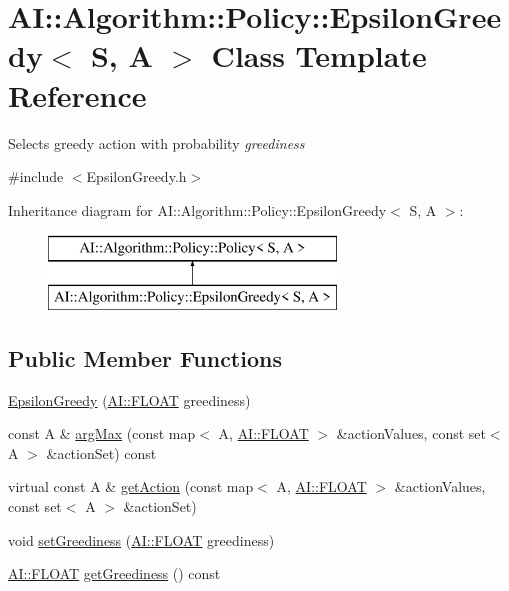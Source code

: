 \hypertarget{classAI_1_1Algorithm_1_1Policy_1_1EpsilonGreedy}{\section{A\-I\-:\-:Algorithm\-:\-:Policy\-:\-:Epsilon\-Greedy$<$ S, A $>$ Class Template Reference}
\label{classAI_1_1Algorithm_1_1Policy_1_1EpsilonGreedy}
}


Selects greedy action with probability {\itshape greediness}  




{\ttfamily \#include $<$Epsilon\-Greedy.\-h$>$}

Inheritance diagram for A\-I\-:\-:Algorithm\-:\-:Policy\-:\-:Epsilon\-Greedy$<$ S, A $>$\-:\begin{figure}[H]
\begin{center}
\leavevmode
\includegraphics[height=2.000000cm]{classAI_1_1Algorithm_1_1Policy_1_1EpsilonGreedy}
\end{center}
\end{figure}
\subsection*{Public Member Functions}
\begin{DoxyCompactItemize}
\item 
\hyperlink{classAI_1_1Algorithm_1_1Policy_1_1EpsilonGreedy_ab891821ceb3fee0f098ceefad9f5a076}{Epsilon\-Greedy} (\hyperlink{namespaceAI_a41b74884a20833db653dded3918e05c3}{A\-I\-::\-F\-L\-O\-A\-T} greediness)
\item 
const A \& \hyperlink{classAI_1_1Algorithm_1_1Policy_1_1EpsilonGreedy_a1a7489821592b81576e5bc8674fc43c3}{arg\-Max} (const map$<$ A, \hyperlink{namespaceAI_a41b74884a20833db653dded3918e05c3}{A\-I\-::\-F\-L\-O\-A\-T} $>$ \&action\-Values, const set$<$ A $>$ \&action\-Set) const 
\item 
virtual const A \& \hyperlink{classAI_1_1Algorithm_1_1Policy_1_1EpsilonGreedy_a00a2dde7f4df14fd046e034694184f65}{get\-Action} (const map$<$ A, \hyperlink{namespaceAI_a41b74884a20833db653dded3918e05c3}{A\-I\-::\-F\-L\-O\-A\-T} $>$ \&action\-Values, const set$<$ A $>$ \&action\-Set)
\item 
void \hyperlink{classAI_1_1Algorithm_1_1Policy_1_1EpsilonGreedy_a2de58f47fa1663ff4718038f2b268295}{set\-Greediness} (\hyperlink{namespaceAI_a41b74884a20833db653dded3918e05c3}{A\-I\-::\-F\-L\-O\-A\-T} greediness)
\item 
\hyperlink{namespaceAI_a41b74884a20833db653dded3918e05c3}{A\-I\-::\-F\-L\-O\-A\-T} \hyperlink{classAI_1_1Algorithm_1_1Policy_1_1EpsilonGreedy_aac2b63fbb3cf29eb8ea11f21d8d6185d}{get\-Greediness} () const 
\end{DoxyCompactItemize}
